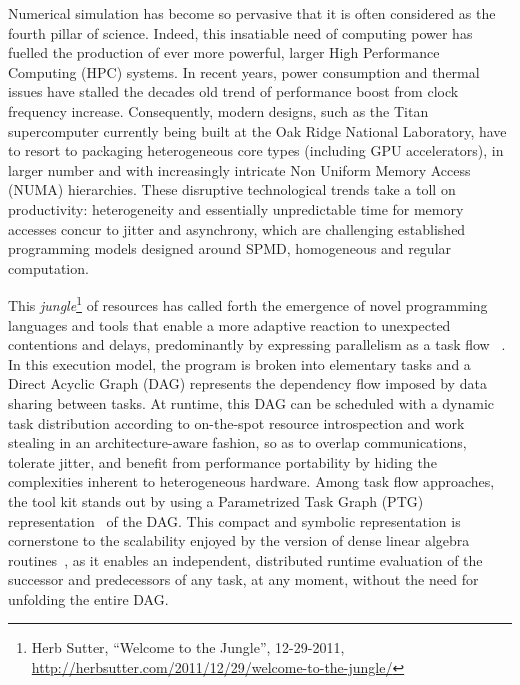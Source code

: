 
Numerical simulation has become so pervasive that it is often considered
as the fourth pillar of science. Indeed, this insatiable need of
computing power has fuelled the production of ever more powerful, larger
High Performance Computing (HPC) systems. In recent years, power
consumption and thermal issues have stalled the decades old trend of
performance boost from clock frequency increase. Consequently, modern
designs, such as the Titan supercomputer currently being built at the
Oak Ridge National Laboratory, have to resort to packaging heterogeneous
core types (including GPU accelerators), in larger number and with
increasingly intricate Non Uniform Memory Access (NUMA) hierarchies.
These disruptive technological trends take a toll on productivity:
heterogeneity and essentially unpredictable time for memory accesses concur
to jitter and asynchrony, which are challenging established programming
models designed around SPMD, homogeneous and regular computation.


This \emph{jungle}\footnote{Herb Sutter, ``Welcome to the Jungle'',
12-29-2011,
\url{http://herbsutter.com/2011/12/29/welcome-to-the-jungle/}} of
resources has called forth the emergence of novel programming languages
and tools that enable a more adaptive reaction to unexpected contentions
and delays, predominantly by expressing parallelism as a
task flow ~\cite{springerlink:10.1007/978-3-642-19328-6_5,PBL08,FYD09,DAGuE:PARCO,ATNW11}.
In this execution model, the program is broken into elementary tasks and
a Direct Acyclic Graph (DAG) represents the dependency flow imposed by
data sharing between tasks. At runtime, this DAG can be scheduled with a
dynamic task distribution according to on-the-spot resource
introspection and work stealing in an architecture-aware fashion, so as
to overlap communications, tolerate jitter, and benefit from performance
portability by hiding the complexities inherent to heterogeneous
hardware. Among task flow approaches, the \dague tool kit stands out by
using a Parametrized Task Graph (PTG) representation~\cite{CJY04} of the
DAG. This compact and symbolic representation is cornerstone to the
scalability enjoyed by the \dague version of dense linear
algebra routines~\cite{DAGuE:PARCO}, as it enables an independent,
distributed runtime evaluation of the successor and predecessors of any
task, at any moment, without the need for unfolding the entire DAG.

